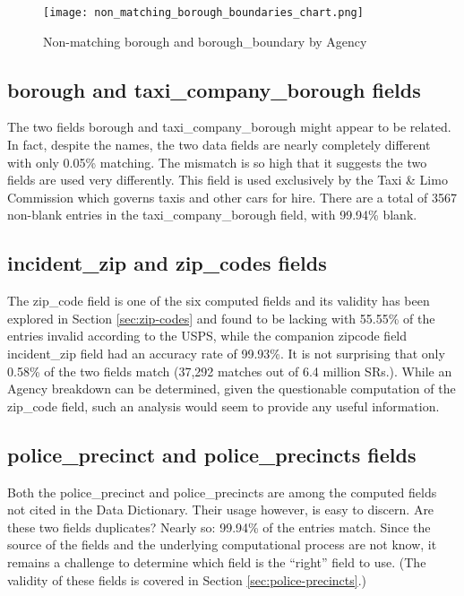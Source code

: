 \documentclass[12pt, titlepage]{article}
\begin{document}
	\begin{figure}[H]
		 \centering
		 \texttt{[image: non\_matching\_borough\_boundaries\_chart.png]}
		 \caption{Non-matching borough and borough\_boundary by Agency }
		 \label{fig:borough-boundaries}
	\end{figure}	
	
\subsection{borough and taxi\_company\_borough fields}
The two fields borough and taxi\_company\_borough might appear to be related. In fact, despite the names, 
the two data fields are nearly completely different with only 0.05\% matching. The mismatch is so
high that it suggests the two fields are used very differently.  This field is used exclusively by the 
Taxi \& Limo Commission which governs taxis and other cars for hire.
There are a total of 3567 non-blank entries in the taxi\_company\_borough field, with 99.94\% blank.

 \subsection{incident\_zip and zip\_codes fields}
 The zip\_code field is one of the six computed fields and its validity has been explored in Section \ref{sec:zip-codes} and
 found to be lacking with 55.55\% of the entries invalid according to the USPS, while the companion zipcode
 field incident\_zip field had an accuracy rate of 99.93\%. It is not surprising that 
 only 0.58\% of the two fields match (37,292 matches out of 6.4 million SRs.). While an Agency breakdown can be
 determined, given the questionable computation of the zip\_code field, such an analysis would
 seem to provide any useful information.  

 \subsection{police\_precinct and police\_precincts fields}  
Both the police\_precinct and police\_precincts are among the computed fields not cited in the Data Dictionary. Their usage however, is easy to discern. Are these two fields duplicates? Nearly so:  99.94\% of the entries match. Since the source of the fields and the underlying computational process are not know, it remains a challenge to determine which field is
the ``right'' field to use. (The validity of these fields is covered in Section \ref{sec:police-precincts}.)
\end{document}
